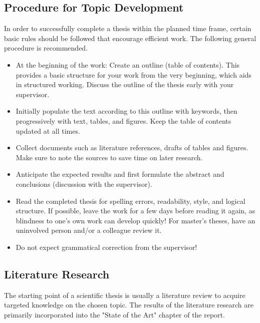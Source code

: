 \documentclass[a4paper, fleqn, headsepline, footsepline, 12pt, parskip=half]{scrartcl}
\begin{document}
\subsection{Procedure for Topic Development}
\label{sec:procedureForTopicDevelopment}

In order to successfully complete a thesis within the planned time frame, certain basic rules should be followed that encourage efficient work. The following general procedure is recommended.

\begin{itemize}
    \item At the beginning of the work: Create an outline (table of contents). This provides a basic structure for your work from the very beginning, which aids in structured working. Discuss the outline of the thesis early with your supervisor.
    \item Initially populate the text according to this outline with keywords, then progressively with text, tables, and figures. Keep the table of contents updated at all times.
    \item Collect documents such as literature references, drafts of tables and figures. Make sure to note the sources to save time on later research.
    \item Anticipate the expected results and first formulate the abstract and conclusions (discussion with the supervisor).
    \item Read the completed thesis for spelling errors, readability, style, and logical structure. If possible, leave the work for a few days before reading it again, as blindness to one's own work can develop quickly! For master's theses, have an uninvolved person and/or a colleague review it.
    \item Do not expect grammatical correction from the supervisor!
\end{itemize}


\subsection{Literature Research}
\label{sec:literatureResearch}

The starting point of a scientific thesis is usually a literature review to acquire targeted knowledge on the chosen topic. The results of the literature research are primarily incorporated into the "State of the Art" chapter of the report.
\end{document}
